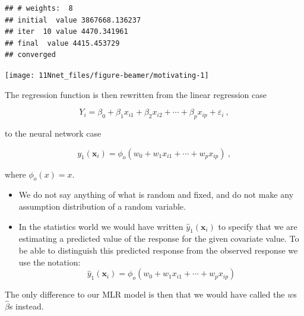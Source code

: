 \documentclass[10pt,ignorenonframetext,]{beamer}
\begin{document}
\begin{frame}[fragile]

\scriptsize

\begin{verbatim}
## # weights:  8
## initial  value 3867668.136237 
## iter  10 value 4470.341961
## final  value 4415.453729 
## converged
\end{verbatim}

\begin{center}\texttt{[image: 11Nnet\_files/figure-beamer/motivating-1]} \end{center}

\end{frame}

\begin{frame}

The regression function is then rewritten from the linear regression
case

\begin{equation*}
 Y_i=\beta_0 + \beta_1 x_{i1}+\beta_2 x_{i2}+\cdots + \beta_p x_{ip}+\varepsilon_i \ ,
\end{equation*}

to the neural network case

\begin{equation*}
y_1({\boldsymbol x}_i)=\phi_o(w_0+w_1 x_{i1}+\cdots + w_p x_{ip}) \ ,
\end{equation*}

where \(\phi_o(x)=x\).

\end{frame}

\begin{frame}

\begin{itemize}
\item
  We do not say anything of what is random and fixed, and do not make
  any assumption distribution of a random variable.
\item
  In the statistics world we would have written
  \(\hat{y}_1({\boldsymbol x}_i)\) to specify that we are estimating a
  predicted value of the response for the given covariate value. To be
  able to distinguish this predicted response from the observed response
  we use the notation:
  \[ \hat{y}_1({\boldsymbol x}_i)=\phi_o(w_0+w_1 x_{i1}+\cdots + w_p x_{ip})\]
\end{itemize}

The only difference to our MLR model is then that we would have called
the \(w\)s \(\hat{\beta}\)s instead.

\end{frame}
\end{document}
